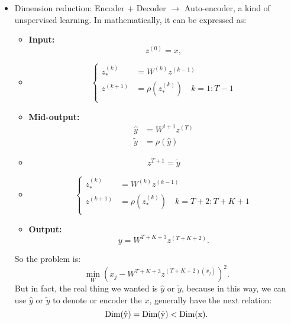 \begin{itemize}
    \item Dimension reduction: Encoder $+$ Decoder $\to$ Auto-encoder, a kind of unspervised learning. In mathematically, it can be expressed as:
        \begin{itemize}
            \item {\bf Input:} 
                $$
                z^{(0)} = x,
                $$
            \item 
                \begin{equation}
                    \begin{cases}
                        z_*^{(k)} &= W^{(k)}z^{(k-1)} \\
                        z^{(k+1)} &= \rho(z_*^{(k)}) \quad k=1:T-1\\
                    \end{cases}
                \end{equation}
            \item {\bf Mid-output:}
                \begin{align}
                    \hat{y} &= W^{t+1}z^{(T)} \\
                    \tilde{y}    &= \rho(\hat{y})
                \end{align}

            \item $$z^{T+1} = \tilde{y}$$

            \item 
                \begin{equation}
                    \begin{cases}
                        z_*^{(k)} &= W^{(k)}z^{(k-1)} \\
                        z^{(k+1)} &= \rho(z_*^{(k)}) \quad k =T + 2 : T + K+1 \\
                    \end{cases}
                \end{equation}

            \item {\bf Output:}
                \begin{equation}
                    y = W^{T+K + 3}z^{(T+K+2)}.
                \end{equation}
        \end{itemize}

        So the problem is:
        \begin{equation}
            \min_{W} (x_j - W^{T+K + 3}z^{(T+K+2)(x_j)})^2.
        \end{equation}
        But in fact, the real thing we wanted is $\hat{y}$ or $\tilde{y}$, because in this way, we can use  $\hat{y}$ or $\tilde{y}$ to denote or encoder the $x$, generally have the next relation:
        \begin{equation}
            \rm{Dim}(\hat{y}) = \rm{Dim}(\tilde{y}) < \rm{Dim}(x).
        \end{equation}


\end{itemize}
